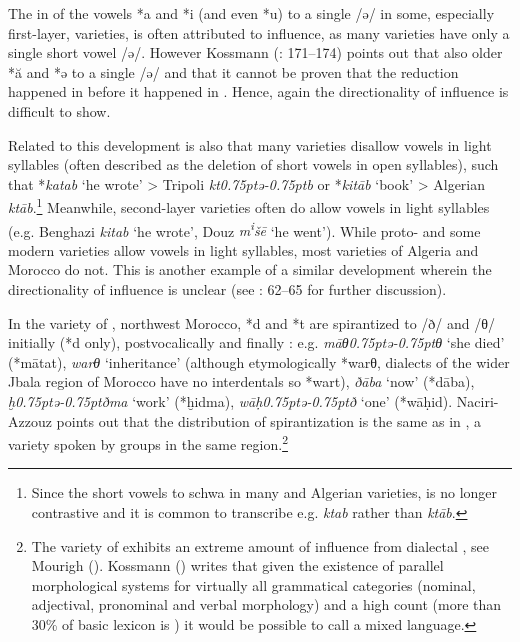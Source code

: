 \documentclass[output=paper]{langsci/langscibook}
\begin{document}
  The  in  of the vowels *{a} and *{i} (and even *{u}) to a single  /ǝ/ in some, especially first-layer, varieties, is often attributed to  influence, as many  varieties have only a single short vowel  /ǝ/. However Kossmann (\citeyear{Kossmann2013book}: 171–174) points out that  also  older *ă and *ǝ to a single  /ǝ/ and that it cannot be proven that the reduction happened in  before it happened in . Hence, again the directionality of influence is difficult to show.

  Related to this development is also that many  varieties disallow vowels in light syllables (often described as the deletion of short vowels in open syllables), such that *\textit{katab} ‘he wrote’ > Tripoli \textit{kt\kern 0.75ptǝ\kern -0.75ptb} or *\textit{kitāb} ‘book’ > Algerian \textit{ktāb}.\footnote{Since the short vowels  to schwa in many  and Algerian varieties,  is no longer contrastive and it is common to transcribe e.g. \textit{ktab} rather than \textit{ktāb}.} Meanwhile, second-layer varieties often do allow vowels in light syllables (e.g. Benghazi \textit{kitab} ‘he wrote’, Douz \textit{m\textsuperscript{i}}\textit{šē} ‘he went’). While proto- and some modern varieties allow vowels in light syllables, most  varieties of Algeria and Morocco do not. This is another example of a similar development wherein the directionality of influence is unclear (see \citealt{Souag2017syllable}: 62–65 for further discussion).

  In the  variety of , northwest Morocco, *d and *t are spirantized to /ð/ and /θ/ initially (*d only), postvocalically and finally \citep{Naciri-Azzouz2016}: e.g. \textit{māθ\kern 0.75ptǝ\kern -0.75ptθ} `she died' (*mātat), \textit{warθ} `inheritance' (although etymologically *warθ, dialects of the wider Jbala region of Morocco have no interdentals so *wart), \textit{ðāba} `now' (*dāba), \textit{ḫ\kern 0.75ptǝ\kern -0.75ptðma} `work' (*ḫidma), \textit{wāḥ\kern 0.75ptǝ\kern -0.75ptð} `one' (*wāḥid). Naciri-Azzouz points out that the distribution of spirantization is the same as in  , a variety spoken by groups in the same region.\footnote{The  variety of  exhibits an extreme amount of influence from dialectal , see Mourigh (\citeyear{Mourigh2015}). Kossmann (\citeyear[431]{Kossmann2013book}) writes that given the existence of parallel morphological systems for virtually all grammatical categories (nominal, adjectival, pronominal and verbal morphology) and a high  count (more than 30\% of basic lexicon is ) it would be possible to call   a mixed language.}
\end{document}
